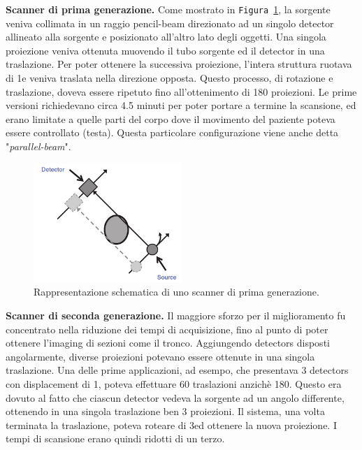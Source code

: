 \documentclass[a4paper,11pt, oneside]{article}
\begin{document}
                \bigskip
                \par
                    \textbf{Scanner di prima generazione.} Come mostrato in \texttt{Figura \ref{fig:first-generation}}, la sorgente veniva collimata in un raggio pencil-beam direzionato ad un singolo detector allineato alla sorgente e posizionato all’altro lato degli oggetti. Una singola proiezione veniva ottenuta muovendo il tubo sorgente ed il detector in una traslazione. Per poter ottenere la successiva proiezione, l’intera struttura ruotava di 1\degree e veniva traslata nella direzione opposta. Questo processo, di rotazione e traslazione, doveva essere ripetuto fino all’ottenimento di 180 proiezioni. Le prime versioni richiedevano circa 4.5 minuti per poter portare a termine la scansione, ed erano limitate a quelle parti del corpo dove il movimento del paziente poteva essere controllato (testa). Questa particolare configurazione viene anche detta "\textit{parallel-beam}".
                            
                    \begin{figure}[h]
                        \centering
                        \includegraphics[width=0.5\textwidth]{first-generation}
                        \caption{Rappresentazione schematica di uno scanner di prima generazione.}
                        \label{fig:first-generation}
                    \end{figure}
                            
                \bigskip
                \par
                    \textbf{Scanner di seconda generazione.} Il maggiore sforzo per il miglioramento fu concentrato nella riduzione dei tempi di acquisizione, fino al punto di poter ottenere l’imaging di sezioni come il tronco. Aggiungendo detectors disposti angolarmente, diverse proiezioni potevano essere ottenute in una singola traslazione. Una delle prime applicazioni, ad esempo, che presentava 3 detectors con displacement di 1\degree, poteva effettuare 60 traslazioni anzichè 180. Questo era dovuto al fatto che ciascun detector vedeva la sorgente ad un angolo differente, ottenendo in una singola traslazione ben 3 proiezioni. Il sistema, una volta terminata la traslazione, poteva roteare di 3\degree  ed ottenere la nuova proiezione. I tempi di scansione erano quindi ridotti di un terzo. 
                        
\end{document}
